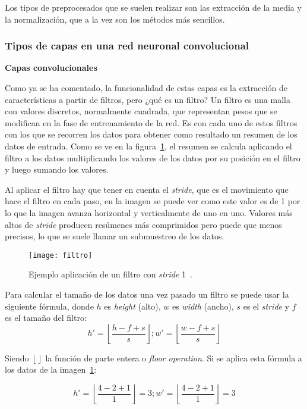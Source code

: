 Los tipos de preprocesados que se suelen realizar son las extracción de la media y la normalización, que a la vez son los métodos más sencillos.

\subsubsection{Tipos de capas en una red neuronal convolucional}
\textbf{Capas convolucionales}

Como ya se ha comentado, la funcionalidad de estas capas es la extracción de características a partir de filtros, pero ¿qué es un filtro? Un filtro es una malla con valores discretos, normalmente cuadrada, que representan pesos que se modifican en la fase de entrenamiento de la red. Es con cada uno de estos filtros con los que se recorren los datos para obtener como resultado un resumen de los datos de entrada. Como se ve en la figura~\ref{fig:filtro}, el resumen se calcula aplicando el filtro a los datos multiplicando los valores de los datos por su posición en el filtro y luego sumando los valores.

Al aplicar el filtro hay que tener en cuenta el \textit{stride}, que es el movimiento que hace el filtro en cada paso, en la imagen se puede ver como este valor es de 1 por lo que la imagen avanza horizontal y verticalmente de uno en uno. Valores más altos de \textit{stride} producen resúmenes más comprimidos pero puede que menos precisos, lo que se suele llamar un submuestreo de los datos.

\begin{figure}[h]
	\centering
	\texttt{[image: filtro]}
	\caption{Ejemplo aplicación de un filtro con \textit{stride} 1~\cite{cnn}.}
	\label{fig:filtro}
\end{figure}

Para calcular el tamaño de los datos una vez pasado un filtro se puede usar la siguiente fórmula, donde $h$ es \textit{height} (alto), $w$ es \textit{width} (ancho), $s$ es el \textit{stride} y $f$ es el tamaño del filtro:
\begin{equation}
h'=\left \lfloor \frac{h-f+s}{s} \right \rfloor; w'= \left \lfloor \frac{w-f+s}{s} \right \rfloor
\end{equation}

Siendo $\left \lfloor  \right \rfloor$ la función de parte entera o \textit{floor operation}. Si se aplica esta fórmula a los datos de la imagen~\ref{fig:filtro}:

\begin{equation}
h'=\left \lfloor \frac{4-2+1}{1} \right \rfloor = 3; w'= \left \lfloor \frac{4-2+1}{1} \right \rfloor=3
\end{equation}

